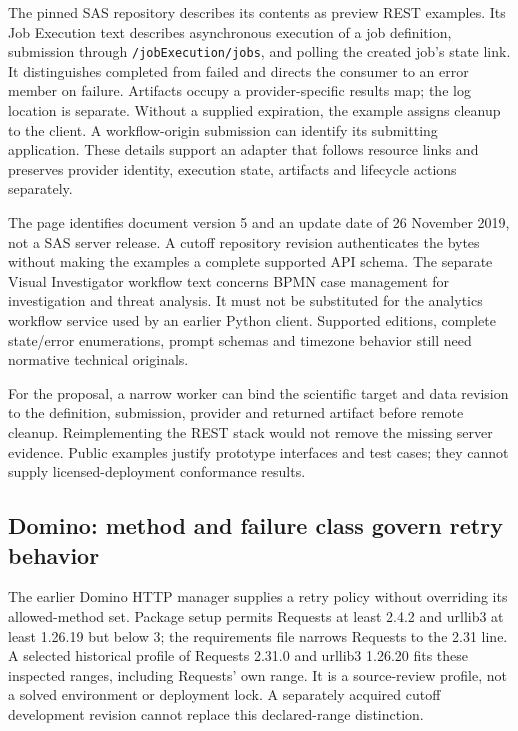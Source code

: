 The pinned SAS repository describes its contents as preview REST examples.
Its Job Execution text describes asynchronous execution of a job definition,
submission through \texttt{/jobExecution/jobs}, and polling the created
job's state link. It distinguishes completed from failed and directs the
consumer to an error member on failure. Artifacts occupy a provider-specific
results map; the log location is separate. Without a supplied expiration,
the example assigns cleanup to the client. A workflow-origin submission
can identify its submitting application. These details support an adapter
that follows resource links and preserves provider identity, execution
state, artifacts and lifecycle actions separately.
\citep{exec24_workflow_contracts_sas}

The page identifies document version 5 and an update date of 26 November
2019, not a SAS server release. A cutoff repository revision authenticates
the bytes without making the examples a complete supported API schema.
The separate Visual Investigator workflow text concerns BPMN case management
for investigation and threat analysis. It must not be substituted for the
analytics workflow service used by an earlier Python client. Supported
editions, complete state/error enumerations, prompt schemas and timezone
behavior still need normative technical originals.
\citep{exec24_workflow_contracts_sas}

For the proposal, a narrow worker can bind the scientific target and data
revision to the definition, submission, provider and returned artifact
before remote cleanup. Reimplementing the REST stack would not remove
the missing server evidence. Public examples justify prototype interfaces
and test cases; they cannot supply licensed-deployment conformance results.

\subsection{Domino: method and failure class govern retry behavior}

The earlier Domino HTTP manager supplies a retry policy without overriding
its allowed-method set. Package setup permits Requests at least 2.4.2 and
urllib3 at least 1.26.19 but below 3; the requirements file narrows Requests
to the 2.31 line. A selected historical profile of Requests 2.31.0 and
urllib3 1.26.20 fits these inspected ranges, including Requests' own range.
It is a source-review profile, not a solved environment or deployment lock.
A separately acquired cutoff development revision cannot replace this
declared-range distinction.~\citep{exec24_workflow_contracts_domino}

